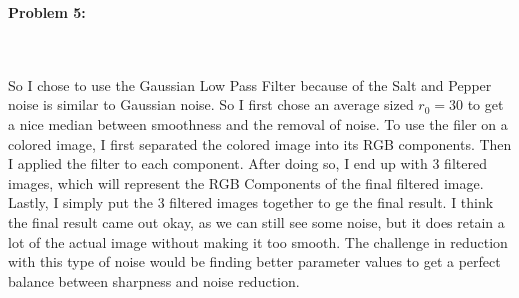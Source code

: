 \documentclass[11pt]{article}
\newenvironment{problem}[1]{\textbf{Problem #1: }}{\newpage}
\begin{document}
\begin{problem}{5}
\begin{enumerate}[label = (\alph*)]
			\\ \\
			So I chose to use the Gaussian Low Pass Filter because of the Salt and Pepper noise is similar to Gaussian noise.  So I first chose an average sized $r_0 = 30$ to get a nice median between smoothness and the removal of noise.  To use the filer on a colored image, I first separated the colored image into its RGB components.  Then I applied the filter to each component.  After doing so, I end up with 3 filtered images, which will represent the RGB Components of the final filtered image.  Lastly, I simply put the 3 filtered images together to ge the final result.  I think the final result came out okay, as we can still see some noise, but it does retain a lot of the actual image without making it too smooth.  The challenge in reduction with this type of noise would be finding better parameter values to get a perfect balance between sharpness and noise reduction.  
		\end{enumerate}
	\end{problem}
\end{document}
